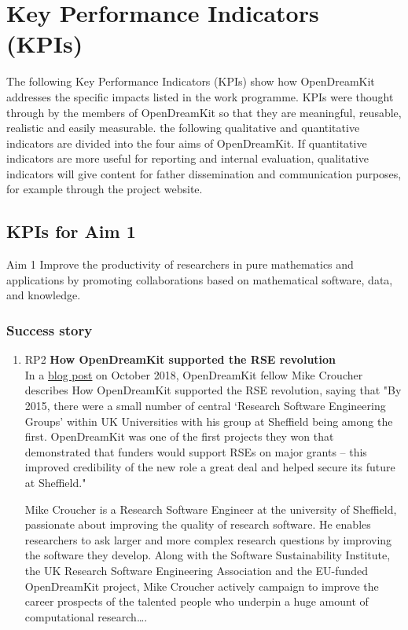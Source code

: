 
\section{Key Performance Indicators (KPIs)}

The following Key Performance Indicators (KPIs) show how OpenDreamKit addresses the specific impacts listed in the work
programme. KPIs were thought through by the members of OpenDreamKit so that they are meaningful, reusable, realistic and easily measurable.
the following qualitative and quantitative indicators are divided into the four aims of OpenDreamKit. If quantitative indicators are more
useful for reporting and internal evaluation, qualitative indicators will give content for father dissemination and communication purposes,
for example through the project website.


\subsection{KPIs for Aim 1}

\begin{recommendation}{Aim 1}
  Improve the productivity of researchers in pure mathematics and
  applications by promoting collaborations based on mathematical
  software, data, and knowledge.
\end{recommendation}

\subsubsection{Success story}

\begin{enumerate}
\item RP2 \textbf{How OpenDreamKit supported the RSE revolution}\\
  In a \href{https://opendreamkit.org/2018/10/29/ODK-RSE/}{blog post}
  on October 2018, OpenDreamKit fellow Mike Croucher describes How
  OpenDreamKit supported the RSE revolution, saying that "By 2015,
  there were a small number of central ‘Research Software Engineering
  Groups’ within UK Universities with his group at Sheffield being
  among the first. OpenDreamKit was one of the first projects they won
  that demonstrated that funders would support RSEs on major grants –
  this improved credibility of the new role a great deal and helped
  secure its future at Sheffield."

  \noindent
  Mike Croucher is a Research Software Engineer at the university
  of Sheffield, passionate about improving the quality of research
  software. He enables researchers to ask larger and more complex
  research questions by improving the software they develop. Along
  with the Software Sustainability Institute, the UK Research Software
  Engineering Association and the EU-funded OpenDreamKit project,
  Mike Croucher actively campaign to improve the career prospects
  of the talented people who underpin a huge amount of computational
  research….
\end{enumerate}

